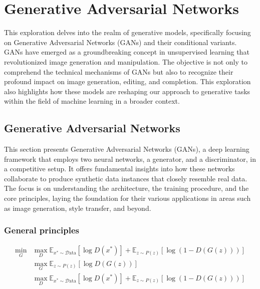 \chapter{Generative Adversarial Networks}
\graphicspath{{figs/2de/}}

This exploration delves into the realm of generative models, specifically focusing on Generative Adversarial Networks (GANs) and their conditional variants. GANs have emerged as a groundbreaking concept in unsupervised learning that revolutionized image generation and manipulation. The objective is not only to comprehend the technical mechanisms of GANs but also to recognize their profound impact on image generation, editing, and completion. This exploration also highlights how these models are reshaping our approach to generative tasks within the field of machine learning in a broader context.

\section{Generative Adversarial Networks}

This section presents Generative Adversarial Networks (GANs), a deep learning framework that employs two neural networks, a generator, and a discriminator, in a competitive setup. It offers fundamental insights into how these networks collaborate to produce synthetic data instances that closely resemble real data. The focus is on understanding the architecture, the training procedure, and the core principles, laying the foundation for their various applications in areas such as image generation, style transfer, and beyond.

\subsection{General principles}

\begin{align}
    \min_{G} &\max_{D} \mathbb{E}_{x^* \sim \mathcal{D}\text{ata}} \left[ \log D(x^*) \right] + \mathbb{E}_{z \sim P(z)} \left[ \log (1 - D(G(z))) \right] \label{eq:minimax} \\
    &\max_{G} \mathbb{E}_{z \sim P(z)} \left[ \log D(G(z)) \right] \label{eq:G_maximization} \\
    &\max_{D} \mathbb{E}_{x^* \sim \mathcal{D}\text{ata}} \left[ \log D(x^*) \right] + \mathbb{E}_{z \sim P(z)} \left[ \log (1 - D(G(z))) \right] \label{eq:D_maximization}
\end{align}
    
